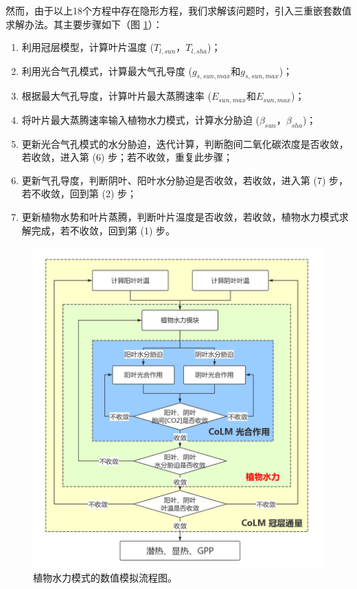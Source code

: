 然而，由于以上18个方程中存在隐形方程，我们求解该问题时，引入三重嵌套数值求解办法。其主要步骤如下（图 \ref{fig:植物水力模式的数值模拟流程图}）：
\begin{enumerate}
    \item 利用冠层模型，计算叶片温度 ($T_{l,sun}$，$T_{l,sha}$)；
    \item 利用光合气孔模式，计算最大气孔导度 ($g_{s,sun,max}$和$g_{s,sun,max}$)；
    \item 根据最大气孔导度，计算叶片最大蒸腾速率 ($E_{sun,max}$和$E_{sun,max}$)；
    \item 将叶片最大蒸腾速率输入植物水力模式，计算水分胁迫 ($\beta_{sun}$，$\beta_{sha}$)；
    \item 更新光合气孔模式的水分胁迫，迭代计算，判断胞间二氧化碳浓度是否收敛，若收敛，进入第 (6) 步；若不收敛，重复此步骤；
    \item 更新气孔导度，判断阴叶、阳叶水分胁迫是否收敛，若收敛，进入第 (7) 步，若不收敛，回到第 (2) 步；
    \item 更新植物水势和叶片蒸腾，判断叶片温度是否收敛，若收敛，植物水力模式求解完成，若不收敛，回到第 (1) 步。
\end{enumerate}

{
    \begin{figure}[]
    \centering
    \includegraphics{Figures/植被水力模式/植物水力模式的数值模拟流程图.png}
    \caption{植物水力模式的数值模拟流程图。}
    \label{fig:植物水力模式的数值模拟流程图}
    \end{figure}
    }

